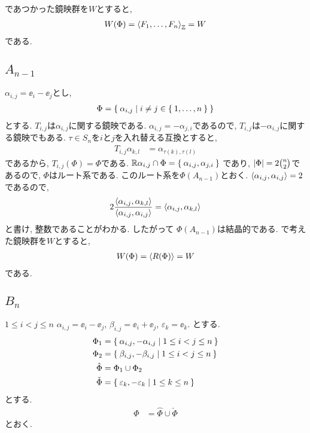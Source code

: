 であつかった鏡映群を$W$とすると,
\begin{align*}
  W(\Phi)=\Braket{F_1,\ldots,F_n}_{\mathbb{Z}}=W
\end{align*}
である.

\subsection{$A_{n-1}$}
\label{ex:an:root}
$\alpha_{i,j}=\ee_i-\ee_j$とし,
\begin{align*}
  \Phi=\Set{\alpha_{i,j}|i\neq j \in \Set{1,\ldots,n}}
\end{align*}
とする.
$T_{i,j}$は$\alpha_{i,j}$に関する鏡映である.
$\alpha_{i,j}=-\alpha_{j,i}$であるので,
$T_{i,j}$は$-\alpha_{i,j}$に関する鏡映でもある.
$\tau\in S_n$を$i$と$j$を入れ替える互換とすると,
\begin{align*}
  T_{i,j}\alpha_{k,l}&=\alpha_{\tau(k),\tau(l)}
\end{align*}
であるから, $T_{i,j}(\Phi)=\Phi$である.
$\mathbb{R}\alpha_{i,j}\cap \Phi=\Set{\alpha_{i,j},\alpha_{j,i}}$
であり,
$\left|\Phi\right|=2\binom{n}{2}$であるので,
$\Phi$はルート系である.
このルート系を$\Phi(A_{n-1})$とおく.
$\Braket{\alpha_{i,j},\alpha_{i,j}}=2$であるので,
\begin{align*}
  2\frac{\Braket{\alpha_{i,j},\alpha_{k,l}}}{\Braket{\alpha_{i,j},\alpha_{i,j}}}=\Braket{\alpha_{i,j},\alpha_{k,l}}
\end{align*}
と書け, 整数であることがわかる.
したがって
$\Phi(A_{n-1})$は結晶的である.
で考えた鏡映群を$W$とすると,
\begin{align*}
  W(\Phi)=\Braket{R(\Phi)}=W
\end{align*}
である.

\subsection{$B_{n}$}
\label{ex:bn:root}
$1\leq i<j\leq n$
$\alpha_{i,j}=\ee_i-\ee_j$,
$\beta_{i,j}=\ee_i+\ee_j$,
$\varepsilon_{k}=\ee_k$.
とする.
\begin{align*}
  \Phi_1&=\Set{\alpha_{i,j},-\alpha_{i,j}|1\leq i<j\leq n}\\
  \Phi_2&=\Set{\beta_{i,j},-\beta_{i,j}|1\leq i<j\leq n}\\
  \hat\Phi&=\Phi_1\cup \Phi_2\\
  \check\Phi&=\Set{\varepsilon_k,-\varepsilon_k|1\leq k\leq n}
\end{align*}
とする.
\begin{align*}
  \Phi&=\hat\Phi\cup \check\Phi
\end{align*}
とおく.


